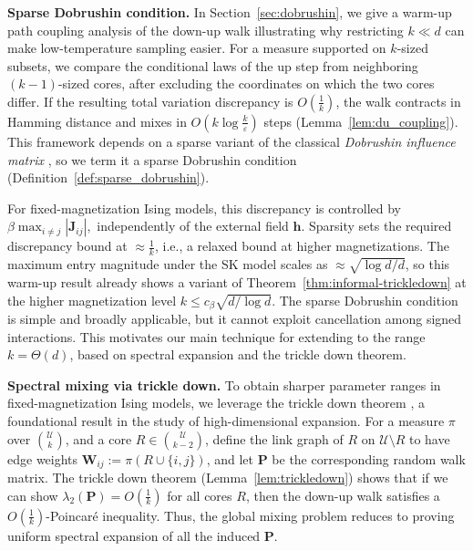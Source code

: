 \documentclass[11pt]{article}
\newcommand{\lam}{\lambda}
\newcommand{\1}{\mathbf{1}}
\newcommand{\0}{\mathbf{0}}
\newcommand{\mj}{{\mathbf{J}}}
\newcommand{\mpp}{{\mathbf{P}}}
\newcommand{\mw}{{\mathbf{W}}}
\newcommand{\vh}{{\mathbf{h}}}
\newcommand{\calU}{{\mathcal{U}}}
\begin{document}
\textbf{Sparse Dobrushin condition.}
In Section~\ref{sec:dobrushin}, we give a warm-up path coupling analysis of the down-up walk illustrating why restricting $k \ll d$ can make low-temperature sampling easier. For a measure supported on $k$-sized subsets, we compare the conditional laws of the up step from neighboring $(k-1)$-sized cores, after excluding the coordinates on which the two cores differ. If the resulting total variation discrepancy is $O(\frac 1 k)$,
the walk contracts in Hamming distance and mixes in
$
O\!\left(k \log \frac{k}{\varepsilon}\right)
$
steps (Lemma~\ref{lem:du_coupling}). This framework depends on a sparse variant of the classical \emph{Dobrushin influence matrix} \cite{Dobruschin68}, so we term it a sparse Dobrushin condition (Definition~\ref{def:sparse_dobrushin}).

For fixed-magnetization Ising models, this discrepancy is controlled by
$
\beta \max_{i \neq j} |\mj_{ij}|,
$
independently of the external field $\vh$. Sparsity sets the required discrepancy bound at $\approx \frac 1 k$, i.e., a relaxed bound at higher magnetizations. The maximum entry magnitude under the SK model scales as $\approx \sqrt{\log d/ d}$, so this warm-up result already shows a variant of Theorem~\ref{thm:informal-trickledown} at the higher magnetization level $k \le c_\beta \sqrt{d/\log d}$. The sparse Dobrushin condition is simple and broadly applicable, but it cannot exploit cancellation among signed interactions. This motivates our main technique for extending to the range $k = \Theta(d)$, based on spectral expansion and the trickle down theorem.

\textbf{Spectral mixing via trickle down.}
To obtain sharper parameter ranges in fixed-magnetization Ising models,
we leverage the trickle
down theorem \cite{oppenheim2018local,alev2020improved}, a foundational result in the study of high-dimensional expansion. For a measure
$\pi$ over
$\binom{\calU}{k}$, and a core
$R\in\binom{\calU}{k-2}$, define the link graph of $R$ on
$\calU\setminus R$ to have edge weights
$\mw_{ij}:=\pi(R\cup\{i,j\})$, and let $\mpp$ be the corresponding random walk matrix. The trickle down theorem (Lemma~\ref{lem:trickledown}) shows that if we can show $\lam_2(\mpp)= O(\frac 1 k)$ for all cores $R$, 
then the down-up walk satisfies a $O(\frac 1 k)$-Poincar\'e inequality.
Thus, the global mixing problem reduces to proving uniform spectral
expansion of all the induced $\mpp$.
\end{document}
